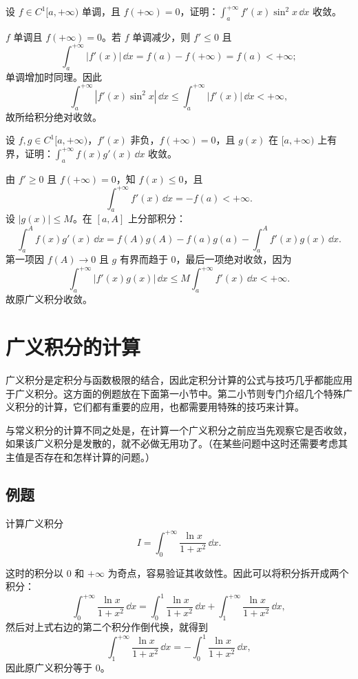 \begin{xexercise}[9]
设 $f\in C^1[a,+\infty)$ 单调，且 $f(+\infty)=0$，证明：$\int_a^{+\infty}f'(x)\sin^2x\,\dd x$ 收敛。
\end{xexercise}
\begin{xsolution}
$f$ 单调且 $f(+\infty)=0$。若 $f$ 单调减少，则 $f'\leq0$ 且
\[
  \int_a^{+\infty}|f'(x)|\,\dd x
  =f(a)-f(+\infty)=f(a)<+\infty;
\]
单调增加时同理。因此
\[
  \int_a^{+\infty}|f'(x)\sin^2x|\,\dd x
  \leq\int_a^{+\infty}|f'(x)|\,\dd x<+\infty,
\]
故所给积分绝对收敛。
\end{xsolution}


\begin{xexercise}[10]
设 $f,g\in C^1[a,+\infty)$，$f'(x)$ 非负，$f(+\infty)=0$，且 $g(x)$ 在 $[a,+\infty)$ 上有界，证明：$\int_a^{+\infty}f(x)g'(x)\,\dd x$ 收敛。
\end{xexercise}
\begin{xsolution}
由 $f'\geq0$ 且 $f(+\infty)=0$，知 $f(x)\leq0$，且
\[
  \int_a^{+\infty}f'(x)\,\dd x=-f(a)<+\infty.
\]
设 $|g(x)|\leq M$。在 $[a,A]$ 上分部积分：
\[
  \int_a^A f(x)g'(x)\,\dd x
  =f(A)g(A)-f(a)g(a)-\int_a^A f'(x)g(x)\,\dd x.
\]
第一项因 $f(A)\to0$ 且 $g$ 有界而趋于 $0$，最后一项绝对收敛，因为
\[
  \int_a^{+\infty}|f'(x)g(x)|\,\dd x\leq M\int_a^{+\infty}f'(x)\,\dd x<+\infty.
\]
故原广义积分收敛。
\end{xsolution}


\section{广义积分的计算}

广义积分是定积分与函数极限的结合，因此定积分计算的公式与技巧几乎都能应用于广义积分。这方面的例题放在下面第一小节中。第二小节则专门介绍几个特殊广义积分的计算，它们都有重要的应用，也都需要用特殊的技巧来计算。

与常义积分的计算不同之处是，在计算一个广义积分之前应当先观察它是否收敛，如果该广义积分是发散的，就不必做无用功了。（在某些问题中这时还需要考虑其主值是否存在和怎样计算的问题。）

\subsection{例题}

\begin{xexample}[12.3.1]
计算广义积分
\[
  I=\int_0^{+\infty}\frac{\ln x}{1+x^2}\,\dd x.
\]
\end{xexample}
\begin{xsolution}
这时的积分以 0 和 $+\infty$ 为奇点，容易验证其收敛性。因此可以将积分拆开成两个积分：
\[
  \int_0^{+\infty}\frac{\ln x}{1+x^2}\,\dd x
  =\int_0^1\frac{\ln x}{1+x^2}\,\dd x
  +\int_1^{+\infty}\frac{\ln x}{1+x^2}\,\dd x,
\]
然后对上式右边的第二个积分作倒代换，就得到
\[
  \int_1^{+\infty}\frac{\ln x}{1+x^2}\,\dd x
  =-\int_0^1\frac{\ln x}{1+x^2}\,\dd x,
\]
因此原广义积分等于 0。
\end{xsolution}

